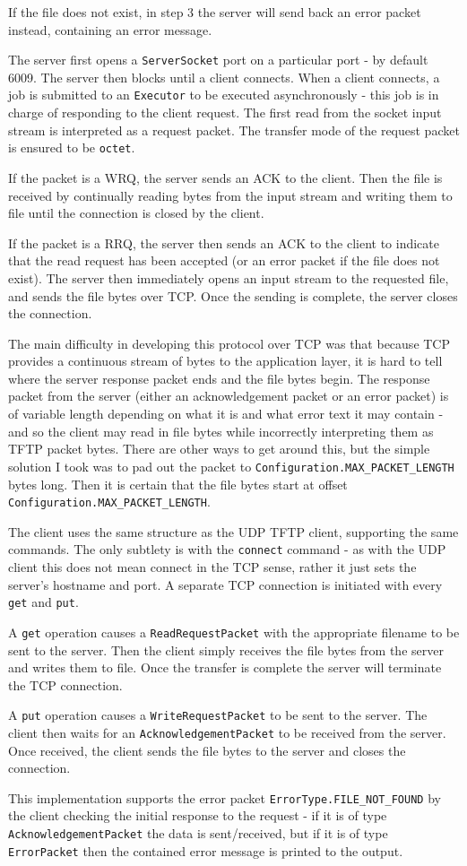 \documentclass[a4paper]{article}
\newcommand{\code}{\texttt}
\begin{document}
If the file does not exist, in step 3 the server will send back an error packet instead, containing an error message.

The server first opens a \code{ServerSocket} port on a particular port - by default 6009. The server then blocks until a client connects. When a client connects, a job is submitted to an \code{Executor} to be executed asynchronously - this job is in charge of responding to the client request. The first read from the socket input stream is interpreted as a request packet. The transfer mode of the request packet is ensured to be \code{octet}.

If the packet is a WRQ, the server sends an ACK to the client. Then the file is received by continually reading bytes from the input stream and writing them to file until the connection is closed by the client.

If the packet is a RRQ, the server then sends an ACK to the client to indicate that the read request has been accepted (or an error packet if the file does not exist). The server then immediately opens an input stream to the requested file, and sends the file bytes over TCP. Once the sending is complete, the server closes the connection.

The main difficulty in developing this protocol over TCP was that because TCP provides a continuous stream of bytes to the application layer, it is hard to tell where the server response packet ends and the file bytes begin. The response packet from the server (either an acknowledgement packet or an error packet) is of variable length depending on what it is and what error text it may contain - and so the client may read in file bytes while incorrectly interpreting them as TFTP packet bytes. There are other ways to get around this, but the simple solution I took was to pad out the packet to \code{Configuration.MAX\_PACKET\_LENGTH} bytes long. Then it is certain that the file bytes start at offset \code{Configuration.MAX\_PACKET\_LENGTH}.

The client uses the same structure as the UDP TFTP client, supporting the same commands. The only subtlety is with the \code{connect} command - as with the UDP client this does not mean connect in the TCP sense, rather it just sets the server's hostname and port. A separate TCP connection is initiated with every \code{get} and \code{put}.

A \code{get} operation causes a \code{ReadRequestPacket} with the appropriate filename to be sent to the server. Then the client simply receives the file bytes from the server and writes them to file. Once the transfer is complete the server will terminate the TCP connection.

A \code{put} operation causes a \code{WriteRequestPacket} to be sent to the server. The client then waits for an \code{AcknowledgementPacket} to be received from the server. Once received, the client sends the file bytes to the server and closes the connection. 

This implementation supports the error packet \code{ErrorType.FILE\_NOT\_FOUND} by the client checking the initial response to the request - if it is of type \code{AcknowledgementPacket} the data is sent/received, but if it is of type \code{ErrorPacket} then the contained error message is printed to the output.
\end{document}
